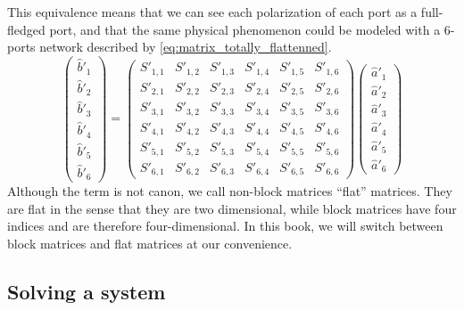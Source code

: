 This equivalence means that we can see each polarization of each port as a full-fledged port, and that the same physical phenomenon could be modeled with a 6-ports network described by \cref{eq:matrix_totally_flattenned}.
\begin{equation}
    \begin{pmatrix}
        \hat{b}'_1 \\ \hat{b}'_2 \\ \hat{b}'_3 \\ \hat{b}'_{4} \\ \hat{b}'_{5} \\ \hat{b}'_{6}
    \end{pmatrix}
    =
    \begin{pmatrix}
        S'_{1, 1} & S'_{1, 2} & S'_{1, 3} & S'_{1, 4} & S'_{1, 5} & S'_{1, 6} \\
        S'_{2, 1} & S'_{2, 2} & S'_{2, 3} & S'_{2, 4} & S'_{2, 5} & S'_{2, 6} \\
        S'_{3, 1} & S'_{3, 2} & S'_{3, 3} & S'_{3, 4} & S'_{3, 5} & S'_{3, 6} \\
        S'_{4, 1} & S'_{4, 2} & S'_{4, 3} & S'_{4, 4} & S'_{4, 5} & S'_{4, 6} \\
        S'_{5, 1} & S'_{5, 2} & S'_{5, 3} & S'_{5, 4} & S'_{5, 5} & S'_{5, 6} \\
        S'_{6, 1} & S'_{6, 2} & S'_{6, 3} & S'_{6, 4} & S'_{6, 5} & S'_{6, 6}
    \end{pmatrix}
    \begin{pmatrix}
        \hat{a}'_1 \\ \hat{a}'_2 \\ \hat{a}'_3 \\ \hat{a}'_{4} \\ \hat{a}'_{5} \\ \hat{a}'_{6}
    \end{pmatrix}
    \label{eq:matrix_totally_flattenned}
\end{equation}
Although the term is not canon, we call non-block matrices ``flat'' matrices.
They are flat in the sense that they are two dimensional, while block matrices have four indices and are therefore four-dimensional.
In this book, we will switch between block matrices and flat matrices at our convenience.


\subsection{Solving a system}
\label{sec:solving_a_system}

